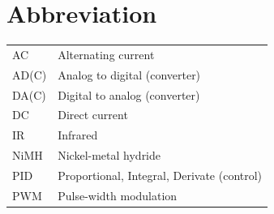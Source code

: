 \documentclass[11pt,a4paper,oneside,article]{memoir}
\begin{document}


\pagestyle{empty} %
\tableofcontents*
\pagestyle{empty} %
\clearpage
\pagestyle{plain}




\pagestyle{empty}
\setlength{\parskip}{1cm}
\chapter*{Abbreviation}
\begin{table}[h]
\setlength{\tabcolsep}{8pt}
\renewcommand{\arraystretch}{2}
\begin{tabular}{l p{12cm}}
AC	& Alternating current\\
AD(C)	& Analog to digital (converter)\\
DA(C)	& Digital to analog (converter)\\
DC	& Direct current\\
IR	& Infrared\\
NiMH	& Nickel-metal hydride\\
PID & Proportional, Integral, Derivate (control)\\
PWM & Pulse-width modulation\\

\end{tabular}
\end{table}
\end{document}
